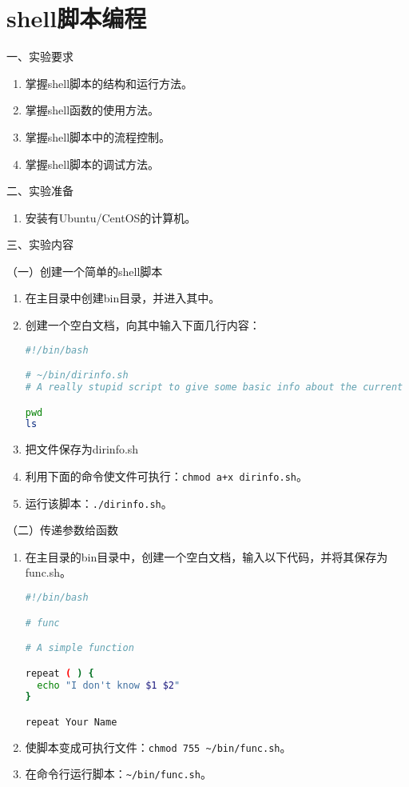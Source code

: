 \chapter{shell脚本编程}

\noindent
一、实验要求
\begin{enumerate}
  \item 掌握shell脚本的结构和运行方法。
  \item 掌握shell函数的使用方法。
  \item 掌握shell脚本中的流程控制。
  \item 掌握shell脚本的调试方法。
\end{enumerate}

\vspace{0.2in}
\noindent
二、实验准备
\begin{enumerate}
  \item 安装有Ubuntu/CentOS的计算机。
\end{enumerate}

\vspace{0.2in}
\noindent
三、实验内容

\vspace{0.1in}
（一）创建一个简单的shell脚本
\begin{enumerate}
  \item 在主目录中创建bin目录，并进入其中。
  \item 创建一个空白文档，向其中输入下面几行内容：
\begin{lstlisting}[language=bash]
#!/bin/bash

# ~/bin/dirinfo.sh
# A really stupid script to give some basic info about the current directory

pwd
ls
\end{lstlisting}
  \item 把文件保存为dirinfo.sh
  \item 利用下面的命令使文件可执行：\verb|chmod a+x dirinfo.sh|。
  \item 运行该脚本：\verb|./dirinfo.sh|。
\end{enumerate}

\vspace{0.1in}
（二）传递参数给函数
\begin{enumerate}
  \item 在主目录的bin目录中，创建一个空白文档，输入以下代码，并将其保存为func.sh。
\begin{lstlisting}[language=bash]
#!/bin/bash

# func

# A simple function

repeat ( ) {
  echo "I don't know $1 $2"
}

repeat Your Name
\end{lstlisting}
  \item 使脚本变成可执行文件：\verb|chmod 755 ~/bin/func.sh|。
  \item 在命令行运行脚本：\verb|~/bin/func.sh|。
\end{enumerate}

